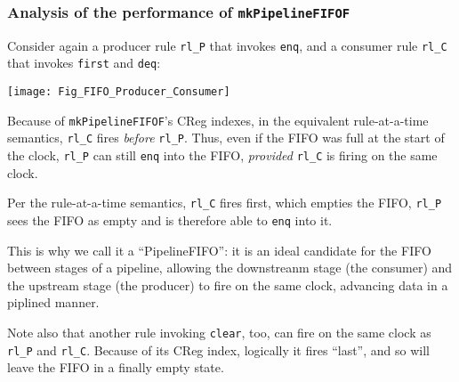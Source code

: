 
\begin{frame}[fragile]
\frametitle{Analysis of the performance of {\tt mkPipelineFIFOF}}

\footnotesize

\begin{minipage}{0.45\textwidth}
  Consider again a producer rule \verb|rl_P| that invokes \verb|enq|, and a
  consumer rule \verb|rl_C| that invokes \verb|first| and \verb|deq|:
\end{minipage}
\hm
\begin{minipage}{0.5\textwidth}
  \texttt{[image: Fig\_FIFO\_Producer\_Consumer]}
\end{minipage}

\vspace{5ex}

Because of {\tt mkPipelineFIFOF}'s CReg indexes, in the equivalent
rule-at-a-time semantics, \verb|rl_C| fires \emph{before} \verb|rl_P|.
Thus, even if the FIFO was full at the start of the clock, \verb|rl_P|
can still \verb|enq| into the FIFO, \emph{provided} \verb|rl_C| is
firing on the same clock.

\vspace{1ex}

Per the rule-at-a-time semantics,
\verb|rl_C| fires first, which empties the FIFO, {\ie} \verb|rl_P|
sees the FIFO as empty and is therefore able to \verb|enq| into it.

\vspace{1ex}

This is why we call it a ``PipelineFIFO'': it is an ideal candidate
for the FIFO between stages of a pipeline, allowing the downstreanm
stage (the consumer) and the upstream stage (the producer) to fire on
the same clock, advancing data in a piplined manner.

\vspace{2ex}

Note also that another rule invoking \verb|clear|, too, can fire on
the same clock as \verb|rl_P| and \verb|rl_C|.  Because of its CReg
index, logically it fires ``last'', and so will leave the FIFO in a
finally empty state.

\end{frame}


